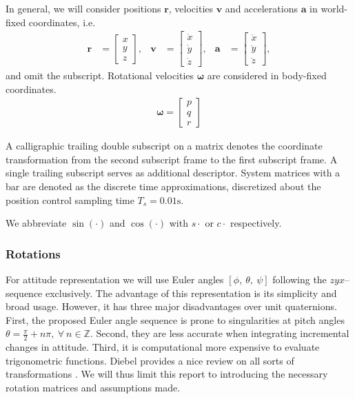 In general, we will consider positions $\mathbf{r}$, velocities $\mathbf{v}$ and accelerations $\mathbf{a}$ in world-fixed coordinates, i.e.
\begin{align}
\mathbf{r} &= \begin{bmatrix}
x \\ y \\ z
\end{bmatrix},
& \mathbf{v} &= \begin{bmatrix}
\dot{x} \\ \dot{y} \\ \dot{z}
\end{bmatrix},
& \mathbf{a} &= \begin{bmatrix}
\ddot{x} \\ \ddot{y} \\ \ddot{z}
\end{bmatrix},
\end{align}
and omit the subscript. Rotational velocities $\boldsymbol{\omega}$ are considered in body-fixed coordinates.
\begin{align}
\boldsymbol{\omega} = \begin{bmatrix}
p \\ q \\ r
\end{bmatrix}
\end{align}

A calligraphic trailing double subscript on a matrix denotes the coordinate transformation from the second subscript frame to the first subscript frame. A single trailing subscript serves as additional descriptor. System matrices with a bar are denoted as the discrete time approximations, discretized about the position control sampling time $T_s = 0.01 \si{\second}$.

We abbreviate $\sin(\cdot)$ and $\cos(\cdot)$ with $s \cdot$ or $c \cdot$ respectively.

\subsubsection{Rotations}
For attitude representation we will use Euler angles $[\phi,~\theta,~\psi]$ following the $zyx$--sequence exclusively. The advantage of this representation is its simplicity and broad usage. However, it has three major disadvantages over unit quaternions. First, the proposed Euler angle sequence is prone to singularities at pitch angles $\theta = \frac{\pi}{2} + n\pi,~\forall~n\in\mathbb{Z}$. Second, they are less accurate when integrating incremental changes in attitude. Third, it is computational more expensive to evaluate trigonometric functions. Diebel provides a nice review on all sorts of transformations \cite{Diebel2006}. We will thus limit this report to introducing the necessary rotation matrices and assumptions made.

